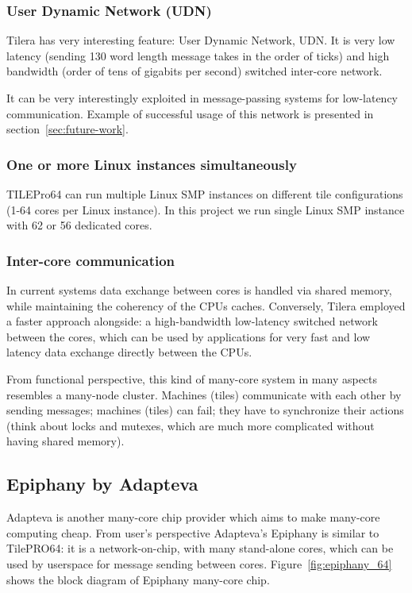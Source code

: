\documentclass[english,11pt]{l4proj}
\begin{document}
\subsubsection{User Dynamic Network (UDN)}
Tilera has very interesting feature: User Dynamic Network, UDN. It is very low
latency (sending 130 word length message takes in the order of ticks) and high
bandwidth (order of tens of gigabits per second) switched inter-core network.

It can be very interestingly exploited in message-passing systems for
low-latency communication. Example of successful usage of this network is
presented in section~\ref{sec:future-work}.

\subsubsection{One or more Linux instances simultaneously}
TILEPro64 can run multiple Linux SMP instances on different tile configurations
(1-64 cores per Linux instance). In this project we run single Linux SMP
instance with 62 or 56 dedicated cores.

\subsubsection{Inter-core communication}
In current systems data exchange between cores is handled via shared memory,
while maintaining the coherency of the CPUs caches. Conversely, Tilera employed
a faster approach alongside: a high-bandwidth low-latency switched network
between the cores, which can be used by applications for very fast and low
latency data exchange directly between the CPUs\cite{tile64}.

From functional perspective, this kind of many-core system in many aspects
resembles a many-node cluster. Machines (tiles) communicate with each other by
sending messages; machines (tiles) can fail; they have to synchronize their
actions (think about locks and mutexes, which are much more complicated without
having shared memory).

\subsection{Epiphany by Adapteva}

Adapteva is another many-core chip provider which aims to make many-core
computing cheap\cite{parallella-kickstarter}. From user's perspective
Adapteva's Epiphany\cite{epiphany} is similar to TilePRO64: it is a
network-on-chip, with many stand-alone cores, which can be used by userspace for
message sending between cores.  Figure~\ref{fig:epiphany_64} shows the block
diagram of Epiphany many-core chip.
\end{document}
